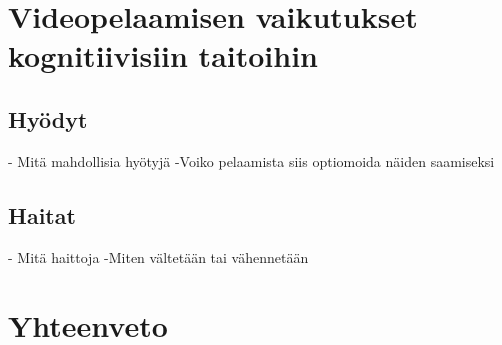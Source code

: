 \documentclass[utf8,bachelor]{gradu3}
\begin{document}
\chapter{Videopelaamisen vaikutukset kognitiivisiin taitoihin}

\section{Hyödyt}
- Mitä mahdollisia hyötyjä
-Voiko pelaamista siis optiomoida näiden saamiseksi

\section{Haitat}
- Mitä haittoja
-Miten vältetään tai vähennetään

\chapter{Yhteenveto}

\printbibliography
\end{document}
